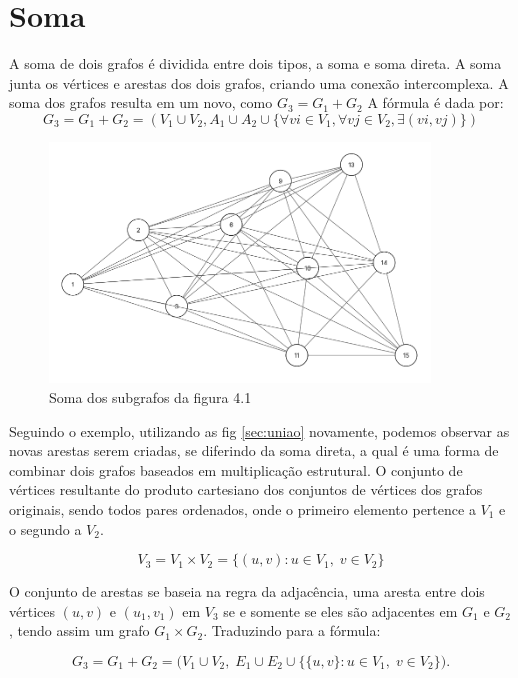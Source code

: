 \section{Soma}\label{sec:soma}
A soma de dois grafos é dividida entre dois tipos, a soma e soma direta.
A soma junta os vértices e arestas dos dois grafos, criando uma conexão intercomplexa. A soma dos grafos resulta em um novo, como $G_3 = G_1 + G_2$ A fórmula é dada por: \\
\[
	G_3 = G_1 + G_2 = (V_1 \cup V_2, A_1 \cup A_2 \cup \{ \forall vi \in V_1, \forall vj \in V_2, \exists(vi, vj) \})
\]

\begin{figure}[!h]
	\centering
	\includegraphics[width=0.9\textwidth]{figuras/soma_NOVO.png}
	\caption{Soma dos subgrafos da figura 4.1}
	\label{fig:somaGrafos}
\end{figure}

Seguindo o exemplo, utilizando as fig \ref{sec:uniao} novamente, podemos observar as novas arestas serem criadas, se diferindo da soma direta, a qual é uma forma de combinar dois grafos baseados em multiplicação estrutural. O conjunto de vértices resultante do produto cartesiano dos conjuntos de vértices dos grafos originais, sendo todos pares ordenados, onde o primeiro elemento pertence a $V_1$ e o segundo a $V_2$.

\[
	V_3 = V_1 \times V_2 = \{(u,v):u\in V_1,\; v\in V_2\}
\]

O conjunto de arestas se baseia na regra da adjacência, uma aresta entre dois vértices $(u, v)$ e $(u_1, v_1)$ em $V_3$ se e somente se eles são adjacentes em $G_1$ e $G_2$, tendo assim um grafo  $G_1 \times G_2$. Traduzindo para a fórmula:

\[ %
	G_3 = G_1+G_2=\big(V_1\cup V_2,\;E_1\cup E_2\cup \{\{u,v\}:u\in V_1,\; v\in V_2\}\big).
\]

